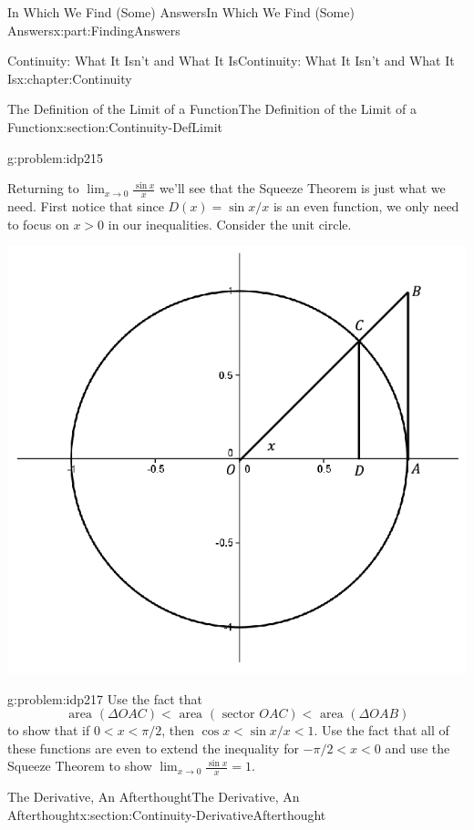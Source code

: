 \documentclass[oneside,10pt,]{book}
\numberwithin{equation}{section}
\def\limit#1#2#3{{\displaystyle\lim_{#1\rightarrow #2}#3}}
\newcommand{\lt}{<}
\begin{document}
\begin{partptx}{In Which We Find (Some) Answers}{}{In Which We Find (Some) Answers}{}{}{x:part:FindingAnswers}
\begin{chapterptx}{Continuity: What It Isn't and What It Is}{}{Continuity: What It Isn't and What It Is}{}{}{x:chapter:Continuity}
\begin{sectionptx}{The Definition of the Limit of a Function}{}{The Definition of the Limit of a Function}{}{}{x:section:Continuity-DefLimit}
\begin{problem}{}{g:problem:idp215}
\end{problem}
Returning to \(\limit{x}{0}{\frac{\sin x}{x}}\) we'll see that the Squeeze Theorem is just what we need.  First notice that since \(D(x)=\sin x/x\) is an even function, we only need to focus on \(x>0\) in our inequalities.  Consider the unit circle.%
\begin{image}{0.2}{0.6}{0.2}%
\includegraphics[width=\linewidth]{images/UnitCircle.png}
\end{image}%
\begin{problem}{}{g:problem:idp217}%
Use the fact that%
\begin{equation*}
\text{ area } (\Delta OAC)\lt \text{ area } (\text{ sector } OAC)\lt \text{ area } (\Delta OAB)
\end{equation*}
to show that if \(0\lt x\lt \pi/2\), then \(\cos x\lt
\sin x/x\lt 1\).  Use the fact that all of these functions are even to extend the inequality for \(-\pi/2\lt x\lt
0\) and use the Squeeze Theorem to show \(\limit{x}{0}{\textstyle\frac{\sin x}{x}}=1\).%
\end{problem}
\end{sectionptx}
%
%
\typeout{************************************************}
\typeout{************************************************}
%
\begin{sectionptx}{The Derivative, An Afterthought}{}{The Derivative, An Afterthought}{}{}{x:section:Continuity-DerivativeAfterthought}

\end{sectionptx}
\end{chapterptx}
\end{partptx}
\end{document}
